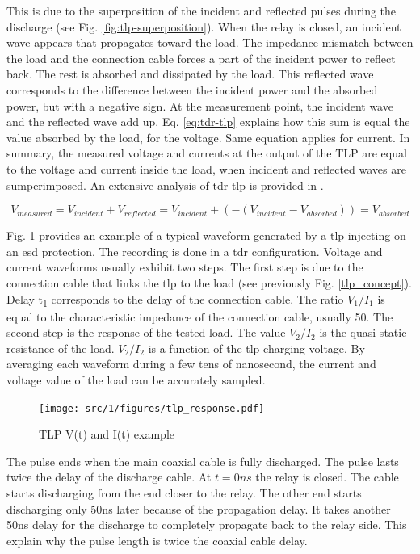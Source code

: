 This is due to the superposition of the incident and reflected pulses during the discharge (see Fig. \ref{fig:tlp-superposition}).
When the relay is closed, an incident wave appears that propagates toward the load.
The impedance mismatch between the load and the connection cable forces a part of the incident power to reflect back.
The rest is absorbed and dissipated by the load.
This reflected wave corresponds to the difference between the incident power and the absorbed power, but with a negative sign.
At the measurement point, the incident wave and the reflected wave add up.
Eq. \ref{eq:tdr-tlp} explains how this sum is equal the value absorbed by the load, for the voltage.
Same equation applies for current.
In summary, the measured voltage and currents at the output of the TLP are equal to the voltage and current inside the load, when incident and reflected waves are sumperimposed.
An extensive analysis of \gls{tdr} \gls{tlp} is provided in \cite{phd-monnereau}.

\begin{equation}
V_{measured} = V_{incident} + V_{reflected} = V_{incident} + (- (V_{incident} - V_{absorbed})) = V_{absorbed}
\label{eq:tdr-tlp}
\end{equation}

Fig. \ref{fig:typical-tlp-response} provides an example of a typical waveform generated by a \gls{tlp} injecting on an \gls{esd} protection.
The recording is done in a \gls{tdr} configuration.
Voltage and current waveforms usually exhibit two steps.
The first step is due to the connection cable that links the \gls{tlp} to the load (see previously Fig. \ref{tlp_concept}).
Delay \textDelta{}t\textsubscript{1} corresponds to the delay of the connection cable.
The ratio $V_{1}/I_{1}$ is equal to the characteristic impedance of the connection cable, usually 50\textOmega{}.
The second step is the response of the tested load.
The value $V_{2}/I_{2}$ is the quasi-static resistance of the load.
$V_{2}/I_{2}$ is a function of the \gls{tlp} charging voltage.
By averaging each waveform during a few tens of nanosecond, the current and voltage value of the load can be accurately sampled.

\begin{figure}[!h]
  \centering
  \texttt{[image: src/1/figures/tlp\_response.pdf]}
  \caption{TLP V(t) and I(t) example}
  \label{fig:typical-tlp-response}
\end{figure}

The pulse ends when the main coaxial cable is fully discharged.
The pulse lasts twice the delay of the discharge cable.
At $t=0ns$ the relay is closed.
The cable starts discharging from the end closer to the relay.
The other end starts discharging only 50ns later because of the propagation delay.
It takes another 50ns delay for the discharge to completely propagate back to the relay side.
This explain why the pulse length is twice the coaxial cable delay.

